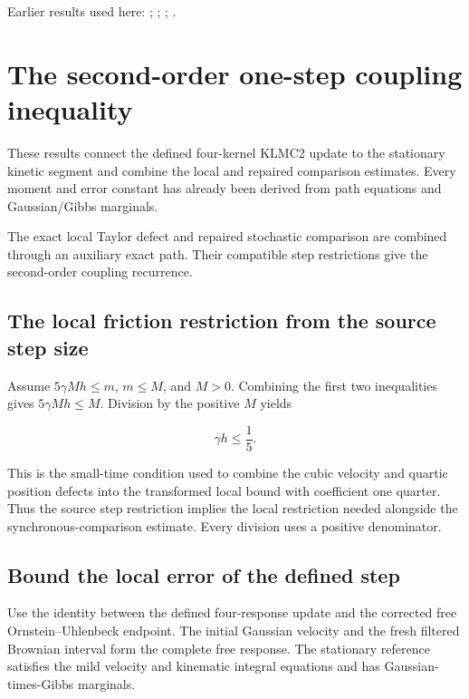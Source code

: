 \documentclass[11pt,a4paper]{report}
\begin{document}
Earlier results used here: \cite[Section~3.13.2]{LangevinLean2026ULASC}; \cite[Section~3.13.5]{LangevinLean2026ULASC}; \cite[Section~3.26.3]{LangevinLean2026ULASC}; \cite[Section~3.28.2]{LangevinLean2026ULASC}.
\section{\texorpdfstring{The second-order one-step coupling inequality}{The second-order one-step coupling inequality}}
\label{proof-module-KineticLangevin-SecondOrderOneStep-lean}


These results connect the defined four-kernel KLMC2 update to the stationary kinetic segment and combine the local and repaired comparison estimates. Every moment and error constant has already been derived from path equations and Gaussian/\allowbreak{}Gibbs marginals.



The exact local Taylor defect and repaired stochastic comparison are combined through an auxiliary exact path. Their compatible step restrictions give the second-order coupling recurrence.

\subsection{\texorpdfstring{The local friction restriction from the source step size}{The local friction restriction from the source step size}}
\label{report-step-KineticLangevin-SecondOrderOneStep-lean-1}


Assume \(5\gamma Mh\le m\), \(m\le M\), and \(M>0\). Combining the first two inequalities gives \(5\gamma Mh\le M\). Division by the positive \(M\) yields

\[\gamma h\le\frac15.\]

This is the small-time condition used to combine the cubic velocity and quartic position defects into the transformed local bound with coefficient one quarter. Thus the source step restriction implies the local restriction needed alongside the synchronous-comparison estimate. Every division uses a positive denominator.

\subsection{\texorpdfstring{Bound the local error of the defined step}{Bound the local error of the defined step}}
\label{report-step-KineticLangevin-SecondOrderOneStep-lean-2}


Use the identity between the defined four-response update and the corrected free Ornstein–Uhlenbeck endpoint. The initial Gaussian velocity and the fresh filtered Brownian interval form the complete free response. The stationary reference satisfies the mild velocity and kinematic integral equations and has Gaussian-times-Gibbs marginals.
\end{document}
